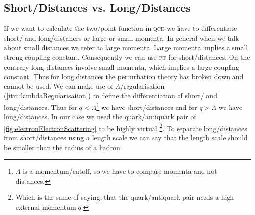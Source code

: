 \documentclass[../../index.tex]{subfiles}
\begin{document}
\subsection{Short\-/Distances vs. Long\-/Distances}
If we want to calculate the two\-/point function in \textsc{qcd} we have to
differentiate short\-/ and long\-/distances or large or small momenta. In
general when we talk about small distances we refer to large momenta. Large
momenta implies a small strong coupling constant. Consequently we can use
\textsc{pt} for short\-/distances. On the contrary long distances involve small
momenta, which implies a large coupling constant. Thus for long distances the
perturbation theory has broken down and cannot be used. We can make use of
\(\Lambda\)\-/regularisation (\cref{itm:lambdaRegularisation}) to define the
differentiation of short\-/ and long\-/distances. Thus for \(q <
\Lambda\)\footnote{$\Lambda$ is a momentum\-/cutoff, so we have to compare
  momenta and not distances.} we have short\-/distances and for \(q > \Lambda\)
we have long\-/distances. In our case we need the quark\-/antiquark pair of
\cref{fig:electronElectronScattering} to be highly virtual \footnote{Which is
  the same of saying, that the quark\-/antiquark pair needs a high external
  momentum \(q\).}. To separate long\-/distances from short\-/distances using a
length scale we can say that the length scale should be smaller than the radius
of a hadron.
\end{document}
